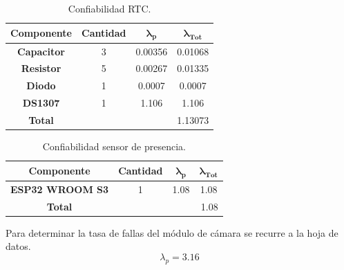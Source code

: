 \begin{table}[H]
\centering
\begin{tabular}{|c|ccc|}
\hline
\textbf{Componente} & \multicolumn{1}{c|}{\textbf{Cantidad}} & \multicolumn{1}{c|}{$\boldsymbol{\lambda_p}$}        & $\boldsymbol{\lambda_{Tot}}$ \\ \hline
\textbf{Capacitor}  & \multicolumn{1}{c|}{3}                 & \multicolumn{1}{c|}{\cellcolor[HTML]{FFFFFF}0.00356} & 0.01068                      \\ \hline
\textbf{Resistor}   & \multicolumn{1}{c|}{5}                 & \multicolumn{1}{c|}{\cellcolor[HTML]{FFFFFF}0.00267} & 0.01335                      \\ \hline
\textbf{Diodo}      & \multicolumn{1}{c|}{1}                 & \multicolumn{1}{c|}{\cellcolor[HTML]{FFFFFF}0.0007}  & 0.0007                       \\ \hline
\textbf{DS1307}     & \multicolumn{1}{c|}{1}                 & \multicolumn{1}{c|}{1.106}                           & 1.106                        \\ \hline
\textbf{Total}      & \multicolumn{1}{l}{}                   & \multicolumn{1}{l}{}                                 & \multicolumn{1}{r|}{1.13073} \\ \hline
\end{tabular}
\caption{Confiabilidad RTC.}
\label{confRTC}
\end{table}
\begin{table}[H]
\centering
\begin{tabular}{|c|ccc|}
\hline
\textbf{Componente}     & \multicolumn{1}{c|}{\textbf{Cantidad}} & \multicolumn{1}{c|}{$\boldsymbol{\lambda_p}$}     & $\boldsymbol{\lambda_{Tot}}$ \\ \hline
\textbf{ESP32 WROOM S3} & \multicolumn{1}{c|}{1}                 & \multicolumn{1}{c|}{\cellcolor[HTML]{FFFFFF}1.08} & 1.08                         \\ \hline
\textbf{Total}          & \multicolumn{1}{l}{}                   & \multicolumn{1}{l}{\cellcolor[HTML]{FFFFFF}}      & \multicolumn{1}{r|}{1.08}    \\ \hline
\end{tabular}
\caption{Confiabilidad sensor de presencia.}
\label{tab:confpres}
\end{table}
Para determinar la tasa de fallas del módulo de cámara se recurre a la hoja de datos.
\begin{equation}
\lambda_p = 3.16
\end{equation}
